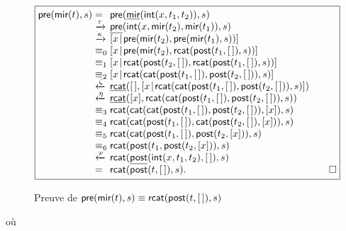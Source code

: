 \begin{figure}
\begin{equation*}
\boxed{
\begin{array}{@{}r@{\;}l@{\;}l@{\qquad}r@{}}
\fun{pre}(\fun{mir}(t),s)
& = & \fun{pre}(\ufun{mir}(\fun{int}(x,t_1,t_2)),s)\\
& \xrightarrow{\smash{\tau}}
& \ufun{pre}(\fun{int}(x,\fun{mir}(t_2),\fun{mir}(t_1)),s)\\
& \xrightarrow{\smash{\kappa}}
& \cons{x}{\fun{pre}(\fun{mir}(t_2),\fun{pre}(\fun{mir}(t_1),s))}\\
& \equiv_0
& \cons{x}{\fun{pre}(\fun{mir}(t_2),
           \fun{rcat}(\fun{post}(t_1,\el),s))}\\
& \equiv_1
& \cons{x}{\fun{rcat}(\fun{post}(t_2,\el),
           \fun{rcat}(\fun{post}(t_1,\el),s))}\\
& \equiv_2
& \cons{x}{\fun{rcat}(\fun{cat}(\fun{post}(t_1,\el), \fun{post}(t_2,\el)), s)}\\
& \xleftarrow{\smash{\zeta}}
& \ufun{rcat}(\el,\cons{x}{\fun{rcat}(\fun{cat}(\fun{post}(t_1,\el),
                                       \fun{post}(t_2,\el)), s)})\\
& \xleftarrow{\smash{\eta}}
& \ufun{rcat}([x],\fun{rcat}(\fun{cat}(\fun{post}(t_1,\el), \fun{post}(t_2,\el)), s))\\
& \equiv_3
& \fun{rcat}(\fun{cat}(\fun{cat}(\fun{post}(t_1,\el), \fun{post}(t_2,\el)), [x]), s)\\
& \equiv_4
& \fun{rcat}(\fun{cat}(\fun{post}(t_1,\el),
                       \fun{cat}(\fun{post}(t_2,\el),
                                 [x])),
             s)\\
& \equiv_5
& \fun{rcat}(\fun{cat}(\fun{post}(t_1,\el),
                       \fun{post}(t_2,[x])),
             s)\\
& \equiv_6
& \fun{rcat}(\fun{post}(t_1,\fun{post}(t_2,[x])),s)\\
& \xleftarrow{\smash{\nu}}
& \fun{rcat}(\ufun{post}(\fun{int}(x,t_1,t_2),\el),s)\\
& =
& \fun{rcat}(\fun{post}(t,\el),s).
& \hfill\Box
\end{array}
}
\end{equation*}
\caption{Preuve de \(\textsf{pre}(\textsf{mir}(t),s) \equiv
  \textsf{rcat}(\textsf{post}(t,[\,]),s)\)}
\label{fig:premir}
\end{figure}
où
